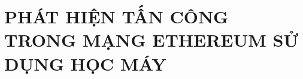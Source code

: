 \clearpage
{}

\setcounter{chapter}{1}
\chapter[{PHÁT HIỆN TẤN CÔNG TRONG MẠNG ETHEREUM SỬ DỤNG HỌC MÁY}]{PHÁT HIỆN TẤN CÔNG TRONG MẠNG ETHEREUM SỬ DỤNG HỌC MÁY}
\label{sec:main}